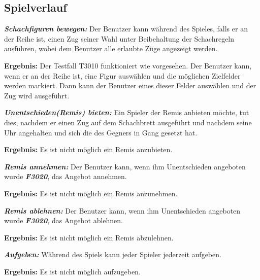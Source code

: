 \documentclass[parskip=full]{scrartcl}
\begin{document}
\subsection{Spielverlauf} 
\begin{description}
	\item[F3010]\textbf{\textit{Schachfiguren bewegen: }}Der Benutzer kann während des Spieles, falls er an der Reihe ist, einen Zug seiner Wahl unter Beibehaltung der Schachregeln ausführen, wobei dem Benutzer alle erlaubte Züge  angezeigt werden.
	\item \textbf{Ergebnis: } Der Testfall T3010 funktioniert wie vorgesehen. Der Benutzer kann, wenn er an der Reihe ist, eine Figur auswählen und die möglichen Zielfelder werden markiert. Dann kann der Benutzer eines dieser Felder auswählen und der Zug wird ausgeführt.
	
	\item[F3020] \textbf{\textit{Unentschieden(Remis) bieten: }} Ein Spieler der Remis anbieten möchte, tut dies, nachdem er einen Zug auf dem Schachbrett ausgeführt und nachdem seine Uhr angehalten und sich die des Gegners in Gang gesetzt hat.
	\item \textbf{Ergebnis: } Es ist nicht möglich ein Remis anzubieten.
	
	\item[F3030] \textbf{\textit{Remis annehmen: }} Der Benutzer kann, wenn ihm Unentschieden angeboten wurde \textbf{\textit{F3020}}, das Angebot annehmen.
	\item \textbf{Ergebnis: } Es ist nicht möglich ein Remis anzunehmen.
	
	\item[F3040] \textbf{\textit{Remis ablehnen: }} Der Benutzer kann, wenn ihm Unentschieden angeboten wurde \textbf{\textit{F3020}}, das Angebot ablehnen.
	\item \textbf{Ergebnis: } Es ist nicht möglich ein Remis abzulehnen.	
	
	\item[F3050] \textbf{\textit{Aufgeben: }} Während des Spiels kann jeder Spieler jederzeit aufgeben.
	\item \textbf{Ergebnis: } Es ist nicht möglich aufzugeben.
	

\end{description}
\end{document}
